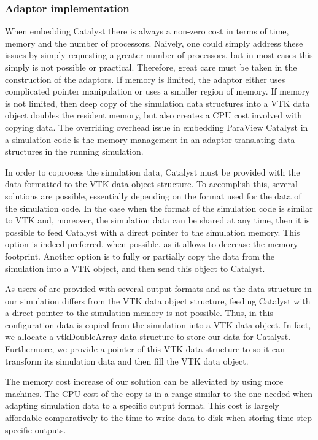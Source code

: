 \subsubsection{Adaptor implementation}
When embedding Catalyst there is always a non-zero cost in terms of time, memory and the number of processors. Naively, one could simply
address these issues by simply requesting a greater number of processors, but in most cases this simply is
not possible or practical. Therefore, great care must be taken in the construction of the adaptors.
If memory is limited, the adaptor either uses complicated pointer manipulation or uses a smaller region
of memory. If memory is not limited, then deep copy of the simulation data structures into a VTK
data object doubles the resident memory, but also creates a CPU cost involved with copying data.
The overriding overhead issue in embedding ParaView Catalyst in a simulation code is the memory
management in an adaptor translating data structures in the running simulation.

In order to coprocess the simulation data, Catalyst must be provided with the
data formatted to the VTK data object structure. To accomplish this, several
solutions are possible, essentially depending on the format used for the data
of the simulation code. In the case when the format of the simulation code is
similar to VTK  and, moreover, the simulation data can be shared at any time,
then it is possible to feed Catalyst with a direct pointer to the simulation
memory. This option is indeed preferred, when possible, as it allows to decrease the memory footprint.
Another option is to fully or partially copy the data from the
simulation into a VTK object, and then send this object to Catalyst.

As users of \CS are provided with several output formats and as the data
structure in our simulation differs from the VTK data object structure, feeding
Catalyst with a direct pointer to the simulation memory is not possible. Thus, in this configuration
data is copied from the simulation into a VTK data object. In fact, we
 allocate a vtkDoubleArray data structure to store our data for Catalyst. Furthermore, we
provide a pointer of this VTK data structure to \CS so it can transform
its simulation data and then fill the VTK data object.

The memory cost increase of our solution can be alleviated by using more
machines. The CPU cost of the copy is in a range similar to the one needed when
adapting simulation data to a specific output format. This cost is largely
affordable comparatively to the time to write data to disk when storing time
step specific outputs. 

